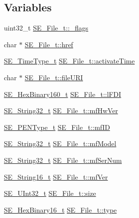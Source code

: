 \subsection*{Variables}
\begin{DoxyCompactItemize}
\item 
uint32\+\_\+t \hyperlink{group__File_gaf9fb522b583f585ebfa63bf9aae654c4}{S\+E\+\_\+\+File\+\_\+t\+::\+\_\+flags}
\item 
char $\ast$ \hyperlink{group__File_ga4f649ba81f3ec3758585c829bffe909e}{S\+E\+\_\+\+File\+\_\+t\+::href}
\item 
\hyperlink{group__TimeType_ga6fba87a5b57829b4ff3f0e7638156682}{S\+E\+\_\+\+Time\+Type\+\_\+t} \hyperlink{group__File_ga10cf0e5d17ce214712253641b664a0a4}{S\+E\+\_\+\+File\+\_\+t\+::activate\+Time}
\item 
char $\ast$ \hyperlink{group__File_ga291723dcc840904ef8ca0ee385c935a3}{S\+E\+\_\+\+File\+\_\+t\+::file\+U\+RI}
\item 
\hyperlink{group__HexBinary160_ga92b92aa55555bdb75f3a59060f2c1632}{S\+E\+\_\+\+Hex\+Binary160\+\_\+t} \hyperlink{group__File_ga74ca6e064ee6671f42955d17470e25b2}{S\+E\+\_\+\+File\+\_\+t\+::l\+F\+DI}
\item 
\hyperlink{group__String32_gac9f59b06b168b4d2e0d45ed41699af42}{S\+E\+\_\+\+String32\+\_\+t} \hyperlink{group__File_ga1cd1a18ab1e17b4a045bebf80d68eaeb}{S\+E\+\_\+\+File\+\_\+t\+::mf\+Hw\+Ver}
\item 
\hyperlink{group__PENType_ga75343bbeec563c431fef2977b4dfa4e9}{S\+E\+\_\+\+P\+E\+N\+Type\+\_\+t} \hyperlink{group__File_gadfaca088f863cdcf43485a271a8a481a}{S\+E\+\_\+\+File\+\_\+t\+::mf\+ID}
\item 
\hyperlink{group__String32_gac9f59b06b168b4d2e0d45ed41699af42}{S\+E\+\_\+\+String32\+\_\+t} \hyperlink{group__File_ga5e0a19dba9edc6f4b68f377ef065b4b7}{S\+E\+\_\+\+File\+\_\+t\+::mf\+Model}
\item 
\hyperlink{group__String32_gac9f59b06b168b4d2e0d45ed41699af42}{S\+E\+\_\+\+String32\+\_\+t} \hyperlink{group__File_ga0811fbd161a3bf54bb0b2c47aaac6d62}{S\+E\+\_\+\+File\+\_\+t\+::mf\+Ser\+Num}
\item 
\hyperlink{group__String16_ga96799b35e03c3e6545eb138a7f879015}{S\+E\+\_\+\+String16\+\_\+t} \hyperlink{group__File_ga89d714f28592f9970532c15f4c5630e3}{S\+E\+\_\+\+File\+\_\+t\+::mf\+Ver}
\item 
\hyperlink{group__UInt32_ga70bd4ecda3c0c85d20779d685a270cdb}{S\+E\+\_\+\+U\+Int32\+\_\+t} \hyperlink{group__File_ga19932bde03637ceb3778be45c83d6d26}{S\+E\+\_\+\+File\+\_\+t\+::size}
\item 
\hyperlink{group__HexBinary16_gac040be0e918a360be6bcf5e8b8ad2c49}{S\+E\+\_\+\+Hex\+Binary16\+\_\+t} \hyperlink{group__File_gac0aab114d7b9752adb600099323cd594}{S\+E\+\_\+\+File\+\_\+t\+::type}
\end{DoxyCompactItemize}


